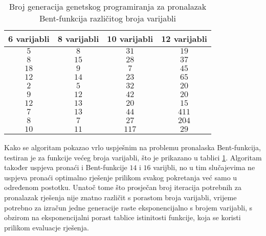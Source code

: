 \begin{table}[]
    \centering
    \begin{tabular}{cccc}
        6 varijabli & 8 varijabli & 10 varijabli & 12 varijabli \\ \hline
         $5$ &  $8$ &  $31$ &  $19$ \\
         $8$ & $15$ &  $28$ &  $37$ \\
        $18$ &  $9$ &   $7$ &  $45$ \\
        $12$ & $14$ &  $23$ &  $65$ \\
         $2$ &  $5$ &  $32$ &  $20$ \\
         $9$ & $12$ &  $42$ &  $20$ \\
        $12$ & $13$ &  $20$ &  $15$ \\
         $7$ & $13$ &  $44$ & $411$ \\
         $8$ &  $7$ &  $27$ & $204$ \\
        $10$ & $11$ & $117$ &  $29$
    \end{tabular}
    \captionsetup{justification=centering}
    \caption{Broj generacija genetskog programiranja za pronalazak Bent-funkcija različitog broja varijabli}
    \label{tbl:gp_bent}
\end{table}
Kako se algoritam pokazao vrlo uspješnim na problemu pronalaska Bent-funkcija, testiran je za funkcije većeg broja varijabli, što je prikazano u tablici \ref{tbl:gp_bent}.
Algoritam također uspjeva pronaći i Bent-funkcije $14$ i $16$ varijbli, no u tim slučajevima ne uspjeva pronaći optimalno rješenje prilikom svakog pokretanja već samo u određenom postotku.
Unatoč tome što prosječan broj iteracija potrebnih za pronalazak rješenja nije znatno različit s porastom broja varijabli, vrijeme potrebno za izračun jedne generacije raste eksponencijalno s brojem varijabli, s obzirom na eksponencijalni porast tablice istinitosti funkcije, koja se koristi prilikom evaluacje rješenja.

